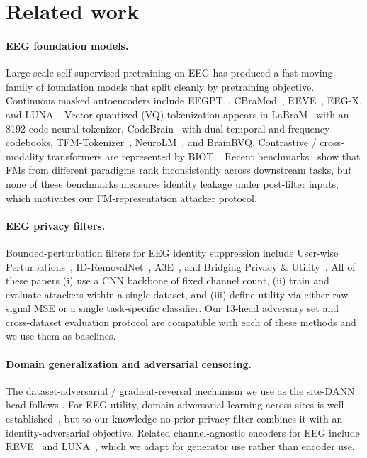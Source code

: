\section{Related work}
\label{sec:related}

\paragraph{EEG foundation models.} Large-scale self-supervised pretraining on EEG has produced a fast-moving family of foundation models that split cleanly by pretraining objective. Continuous masked autoencoders include EEGPT~\citep{eegpt}, CBraMod~\citep{cbramod}, REVE~\citep{reve}, EEG-X, and LUNA~\citep{luna}. Vector-quantized (VQ) tokenization appears in LaBraM~\citep{labram} with an 8192-code neural tokenizer, CodeBrain~\citep{codebrain} with dual temporal and frequency codebooks, TFM-Tokenizer~\citep{tfm_tokenizer}, NeuroLM~\citep{neurolm}, and BrainRVQ. Contrastive / cross-modality transformers are represented by BIOT~\citep{biot}. Recent benchmarks~\citep{eeg_fm_bench} show that FMs from different paradigms rank inconsistently across downstream tasks, but none of these benchmarks measures identity leakage under post-filter inputs, which motivates our FM-representation attacker protocol.

\paragraph{EEG privacy filters.} Bounded-perturbation filters for EEG identity suppression include User-wise Perturbations~\citep{unlearnable_eeg_meng}, ID-RemovalNet~\citep{wang2025idremovalnet}, A3E~\citep{a3e_eeg}, and Bridging Privacy \& Utility~\citep{bridging_privacy_utility}. All of these papers (i) use a CNN backbone of fixed channel count, (ii) train and evaluate attackers within a single dataset, and (iii) define utility via either raw-signal MSE or a single task-specific classifier. Our 13-head adversary set and cross-dataset evaluation protocol are compatible with each of these methods and we use them as baselines.

\paragraph{Domain generalization and adversarial censoring.} The dataset-adversarial / gradient-reversal mechanism we use as the site-DANN head follows \citet{ganin2015_dann}. For EEG utility, domain-adversarial learning across sites is well-established~\citep{exploiting_multi_eeg_domains}, but to our knowledge no prior privacy filter combines it with an identity-adversarial objective. Related channel-agnostic encoders for EEG include REVE~\citep{reve} and LUNA~\citep{luna}, which we adapt for generator use rather than encoder use.

